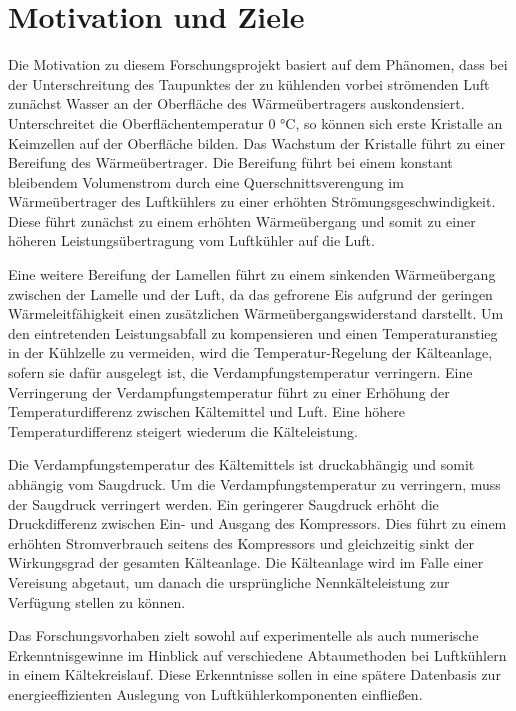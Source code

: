 \chapter{Motivation und Ziele}
\label{cha:Motivation_und_Ziele}


Die Motivation zu diesem Forschungsprojekt basiert auf dem Phänomen, dass bei der Unterschreitung des Taupunktes der zu kühlenden vorbei strömenden Luft zunächst Wasser an der Oberfläche des Wärmeübertragers auskondensiert. Unterschreitet die Oberflächentemperatur 0 °C, so können sich erste Kristalle an Keimzellen auf der Oberfläche bilden. Das Wachstum der Kristalle führt zu einer Bereifung des Wärmeübertrager. Die Bereifung führt bei einem konstant bleibendem Volumenstrom durch eine Querschnittsverengung im Wärmeübertrager des Luftkühlers zu einer erhöhten Strömungsgeschwindigkeit. Diese führt zunächst zu einem erhöhten Wärmeübergang und somit zu einer höheren Leistungsübertragung vom Luftkühler auf die Luft.\citep{Schydlo2010}

Eine weitere Bereifung der Lamellen führt zu einem sinkenden Wärmeübergang zwischen der Lamelle und der Luft, da das gefrorene Eis aufgrund der geringen Wärmeleitfähigkeit einen zusätzlichen Wärmeübergangswiderstand darstellt. Um den eintretenden Leistungsabfall zu kompensieren und einen Temperaturanstieg in der Kühlzelle zu vermeiden, wird die Temperatur-Regelung der Kälteanlage, sofern sie dafür ausgelegt ist, die Verdampfungstemperatur verringern. Eine Verringerung der Verdampfungstemperatur führt zu einer Erhöhung der Temperaturdifferenz zwischen Kältemittel und Luft. Eine höhere Temperaturdifferenz steigert wiederum die Kälteleistung. 

Die Verdampfungstemperatur des Kältemittels ist druckabhängig und somit abhängig vom Saugdruck. Um die Verdampfungstemperatur zu verringern, muss der Saugdruck verringert werden. Ein geringerer Saugdruck erhöht die Druckdifferenz zwischen Ein- und Ausgang des Kompressors. Dies führt zu einem erhöhten Stromverbrauch seitens des Kompressors und gleichzeitig sinkt der Wirkungsgrad der gesamten Kälteanlage.
Die Kälteanlage wird im Falle einer Vereisung abgetaut, um danach die ursprüngliche Nennkälteleistung zur Verfügung stellen zu können.

Das Forschungsvorhaben zielt sowohl auf experimentelle als auch numerische Erkenntnisgewinne im Hinblick auf verschiedene Abtaumethoden bei Luftkühlern in einem Kältekreislauf. Diese Erkenntnisse sollen in eine spätere Datenbasis zur energieeffizienten Auslegung von Luftkühlerkomponenten einfließen.

